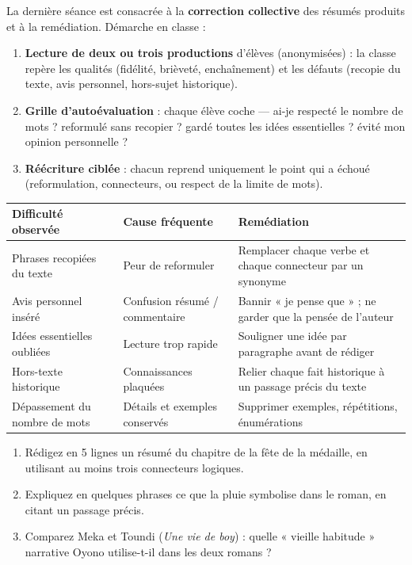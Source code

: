 \documentclass[11pt]{article}
\newcommand{\cle}[1]{{\popxbold\color{popdark}#1}}
\newcounter{popsec}
\newcounter{popsub}
\newcommand{\courssub}[1]{%
  \stepcounter{popsub}%
  \par\vspace{9pt}\noindent{\popxbold\fontsize{11.5}{13}\selectfont\color{popink}{\color{poporange}\thepopsec.\thepopsub}\hspace{6pt}#1}\par\nopagebreak\vspace{4pt}
}
\begin{document}
\courssub{Compte-rendu et remédiation}

La dernière séance est consacrée à la \textbf{correction collective} des résumés produits et à la \cle{remédiation}. Démarche en classe :

\begin{enumerate}
\item \textbf{Lecture de deux ou trois productions} d'élèves (anonymisées) : la classe repère les qualités (fidélité, brièveté, enchaînement) et les défauts (recopie du texte, avis personnel, hors-sujet historique).
\item \textbf{Grille d'autoévaluation} : chaque élève coche — ai-je respecté le nombre de mots ? reformulé sans recopier ? gardé toutes les idées essentielles ? évité mon opinion personnelle ?
\item \textbf{Réécriture ciblée} : chacun reprend uniquement le point qui a échoué (reformulation, connecteurs, ou respect de la limite de mots).
\end{enumerate}

\begin{center}
\begin{tabularx}{\linewidth}{|l|X|X|}
\hline
\rowcolor{popblueL} \textbf{Difficulté observée} & \textbf{Cause fréquente} & \textbf{Remédiation} \\
\hline
Phrases recopiées du texte & Peur de reformuler & Remplacer chaque verbe et chaque connecteur par un synonyme \\
\hline
Avis personnel inséré & Confusion résumé / commentaire & Bannir « je pense que » ; ne garder que la pensée de l'auteur \\
\hline
Idées essentielles oubliées & Lecture trop rapide & Souligner une idée par paragraphe avant de rédiger \\
\hline
Hors-texte historique & Connaissances plaquées & Relier chaque fait historique à un passage précis du texte \\
\hline
Dépassement du nombre de mots & Détails et exemples conservés & Supprimer exemples, répétitions, énumérations \\
\hline
\end{tabularx}
\end{center}

\begin{exercice}
\begin{enumerate}
\item Rédigez en 5 lignes un résumé du chapitre de la fête de la médaille, en utilisant au moins trois connecteurs logiques.
\item Expliquez en quelques phrases ce que la pluie symbolise dans le roman, en citant un passage précis.
\item Comparez Meka et Toundi (\emph{Une vie de boy}) : quelle « vieille habitude » narrative Oyono utilise-t-il dans les deux romans ?
\end{enumerate}
\end{exercice}
\end{document}
